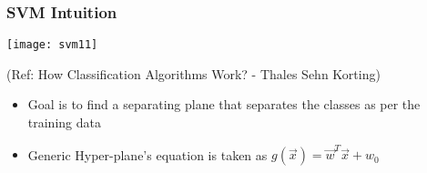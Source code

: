 







\begin{frame}[fragile] \frametitle{SVM Intuition}

\begin{center}
\texttt{[image: svm11]}

\tiny{(Ref: How Classification Algorithms Work? - Thales Sehn Korting)}
\end{center}
\begin{itemize}
\item Goal is to find a separating plane that separates the classes as per the training data
\item Generic Hyper-plane's equation is taken as $g(\overrightarrow{x}) = \overrightarrow{w}^T \overrightarrow{x}+ w_0$
\end{itemize}
\end{frame}



